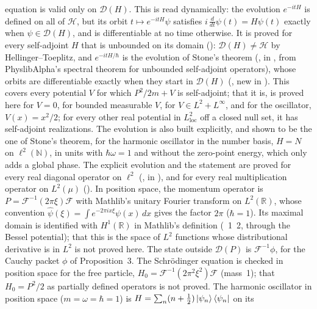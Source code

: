 \documentclass[11pt]{article}
\begin{document}
\begin{itemize}
  equation is valid only on $\mathcal{D}(H)$. This is read dynamically: the evolution
  $e^{-itH}$ is defined on all of $\mathcal{H}$, but its orbit $t \mapsto e^{-itH}\psi$
  satisfies $i\,\tfrac{d}{dt}\psi(t) = H\psi(t)$ exactly when $\psi \in \mathcal{D}(H)$, and is
  differentiable at no time otherwise. It is proved for every self-adjoint $H$ that is
  unbounded on its domain (): $\mathcal{D}(H) \ne \mathcal{H}$
  by Hellinger--Toeplitz, and $e^{-itH/\hbar}$ is the evolution of Stone's theorem
  (, in , from PhyslibAlpha's spectral theorem for
  unbounded self-adjoint operators), whose orbits are differentiable exactly when they start in
  $\mathcal{D}(H)$ (, new in
  ). This covers every potential $V$ for which $P^2/2m + V$ is self-adjoint;
  that it is, is proved here for $V = 0$, for bounded measurable $V$, for $V \in L^2 + L^\infty$,
  and for the oscillator, $V(x) = x^2/2$; for every other real potential in
  $L^2_{\mathrm{loc}}$ off a closed null set, it has self-adjoint realizations. The evolution
  is also built explicitly, and
  shown to be the one of Stone's theorem, for the harmonic oscillator in the number
  basis, $H = N$ on $\ell^2(\mathbb{N})$, in units with $\hbar\omega = 1$ and without the
  zero-point energy, which only adds a global phase. The explicit evolution and the statement
  are proved for every real diagonal operator on $\ell^2$ (, in
  ), and for every real multiplication operator on $L^2(\mu)$
  (). In position
  space, the momentum operator is $P = \mathcal{F}^{-1}(2\pi\xi)\mathcal{F}$ with Mathlib's
  unitary Fourier transform on $L^2(\mathbb{R})$, whose convention
  $\hat\psi(\xi) = \int e^{-2\pi i x\xi}\psi(x)\,dx$ gives the factor $2\pi$ ($\hbar = 1$).
  Its maximal domain is identified with $H^1(\mathbb{R})$ in Mathlib's definition
  (~1~2, through the Bessel potential); that this is the space of $L^2$
  functions whose distributional derivative is in $L^2$ is not proved here. The state outside
  $\mathcal{D}(P)$ is $\mathcal{F}^{-1}\phi$, for the Cauchy packet $\phi$ of
  Proposition~3. The Schr\"odinger equation is checked in position space for the free
  particle, $H_0 = \mathcal{F}^{-1}(2\pi^2\xi^2)\mathcal{F}$ (mass~1); that $H_0 = P^2/2$ as
  partially defined operators is not proved. The harmonic oscillator in position space
  ($m = \omega = \hbar = 1$) is $H = \sum_n (n + \tfrac12)\ket{\psi_n}\bra{\psi_n}$ on its

\end{itemize}
\end{document}

